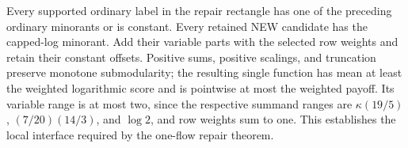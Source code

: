 Every supported ordinary label in the repair rectangle has one of the
preceding ordinary minorants or is constant. Every retained NEW candidate
has the capped-log minorant. Add their variable parts with the selected
row weights and retain their constant offsets. Positive sums, positive
scalings, and truncation preserve monotone submodularity; the resulting
single function has mean at least the weighted logarithmic score and is
pointwise at most the weighted payoff. Its variable range is at most two,
since the respective summand ranges are $\kappa(19/5)$, $(7/20)(14/3)$,
and $\log2$, and row weights sum to one. This establishes the local
interface required by the one-flow repair theorem.
